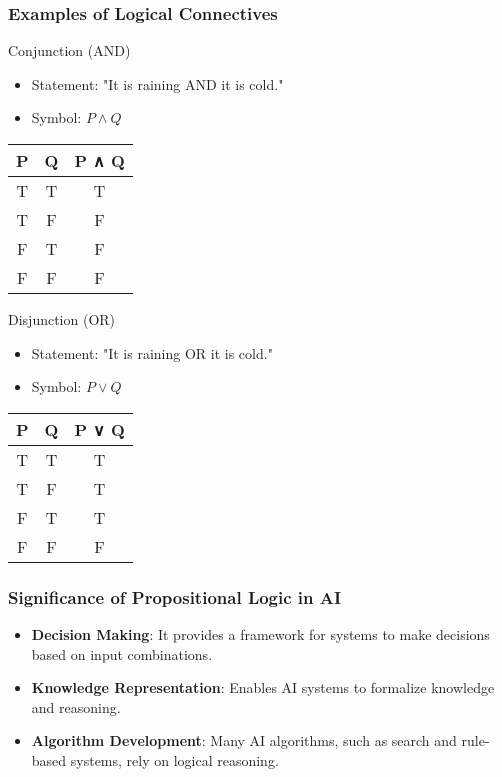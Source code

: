 \documentclass[aspectratio=169]{beamer}
\begin{document}
\begin{frame}[fragile]
    \frametitle{Examples of Logical Connectives}
    \begin{block}{Conjunction (AND)}
        \begin{itemize}
            \item Statement: "It is raining AND it is cold."
            \item Symbol: \( P \land Q \)
        \end{itemize}
        \begin{center}
            \begin{tabular}{|c|c|c|}
                \hline
                P & Q & P ∧ Q \\
                \hline
                T & T & T \\
                T & F & F \\
                F & T & F \\
                F & F & F \\
                \hline
            \end{tabular}
        \end{center}
    \end{block}

    \begin{block}{Disjunction (OR)}
        \begin{itemize}
            \item Statement: "It is raining OR it is cold."
            \item Symbol: \( P \lor Q \)
        \end{itemize}
        \begin{center}
            \begin{tabular}{|c|c|c|}
                \hline
                P & Q & P ∨ Q \\
                \hline
                T & T & T \\
                T & F & T \\
                F & T & T \\
                F & F & F \\
                \hline
            \end{tabular}
        \end{center}
    \end{block}
\end{frame}

\begin{frame}[fragile]
    \frametitle{Significance of Propositional Logic in AI}
    \begin{itemize}
        \item \textbf{Decision Making}: It provides a framework for systems to make decisions based on input combinations.
        \item \textbf{Knowledge Representation}: Enables AI systems to formalize knowledge and reasoning.
        \item \textbf{Algorithm Development}: Many AI algorithms, such as search and rule-based systems, rely on logical reasoning.
    \end{itemize}
\end{frame}
\end{document}
